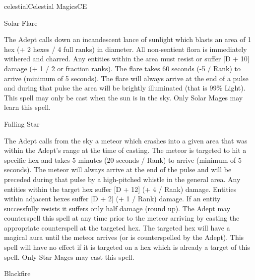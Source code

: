\begin{College}[1.3]{celestial}{Celestial Magics}{CE}
\begin{spell}[S-10 solar]{Solar Flare}

\begin{effects}
The Adept calls down an incandescent lance of sunlight which blasts an
area of 1 hex (+ 2 hexes / 4 full ranks) in diameter.  All
non-sentient flora is immediately withered and charred.  Any entities
within the area must resist or suffer [D + 10] damage (+ 1 / 2 or
fraction ranks).  The flare takes 60 seconds (-5 / Rank) to arrive
(minimum of 5 seconds). The flare will always arrive at the end of a
pulse and during that pulse the area will be brightly illuminated
(that is 99\% Light). This spell may only be cast when the sun is in
the sky. Only Solar Mages may learn this spell.
\end{effects}
\end{spell}

\begin{spell}[S-10 Star]{Falling Star}

\begin{effects}
The Adept calls from the sky a meteor which crashes into a given area
that was within the Adept’s range at the time of casting. The meteor
is targeted to hit a specific hex and takes 5 minutes (20 seconds /
Rank) to arrive (minimum of 5 seconds). The meteor will always arrive
at the end of the pulse and will be preceded during that pulse by a
high-pitched whistle in the general area.  Any entities within the
target hex suffer [D + 12] (+ 4 / Rank) damage.  Entities within
adjacent hexes suffer [D + 2] (+ 1 / Rank) damage.  If an entity
successfully resists it suffers only half damage (round up).  The
Adept may counterspell this spell at any time prior to the meteor
arriving by casting the appropriate counterspell at the targeted hex.
The targeted hex will have a magical aura until the meteor arrives (or
is counterspelled by the Adept).  This spell will have no effect if it
is targeted on a hex which is already a target of this spell.  Only
Star Mages may cast this spell.
\end{effects}
\end{spell}

\begin{spell}[S-10 Dark]{Blackfire}


\end{spell}
\end{College}

